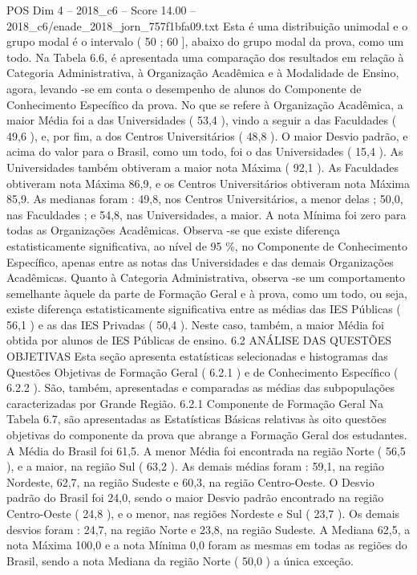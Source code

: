 \begin{textsample}{POS Dim 4 – 2018\_c6 – Score 14.00 – 2018\_c6/enade\_2018\_jorn\_757f1bfa09.txt}
Esta é uma distribuição unimodal e o grupo modal é o intervalo ( 50 ; 60 ], abaixo do grupo modal da prova, como um todo.
Na Tabela 6.6, é apresentada uma comparação dos resultados em relação à Categoria Administrativa, à Organização Acadêmica e à Modalidade de Ensino, agora, levando -se em conta o desempenho de alunos do Componente de Conhecimento Específico da prova.
No que se refere à Organização Acadêmica, a maior Média foi a das Universidades ( 53,4 ), vindo a seguir a das Faculdades ( 49,6 ), e, por fim, a dos Centros Universitários ( 48,8 ).
O maior Desvio padrão, e acima do valor para o Brasil, como um todo, foi o das Universidades ( 15,4 ).
As Universidades também obtiveram a maior nota Máxima ( 92,1 ).
As Faculdades obtiveram nota Máxima 86,9, e os Centros Universitários obtiveram nota Máxima 85,9.
As medianas foram : 49,8, nos Centros Universitários, a menor delas ; 50,0, nas Faculdades ; e 54,8, nas Universidades, a maior.
A nota Mínima foi zero para todas as Organizações Acadêmicas.
Observa -se que existe diferença estatisticamente significativa, ao nível de 95 \%, no Componente de Conhecimento Específico, apenas entre as notas das Universidades e das demais Organizações Acadêmicas.
Quanto à Categoria Administrativa, observa -se um comportamento semelhante àquele da parte de Formação Geral e à prova, como um todo, ou seja, existe diferença estatisticamente significativa entre as médias das IES Públicas ( 56,1 ) e as das IES Privadas ( 50,4 ).
Neste caso, também, a maior Média foi obtida por alunos de IES Públicas de ensino. 6.2 ANÁLISE DAS QUESTÕES OBJETIVAS Esta seção apresenta estatísticas selecionadas e histogramas das Questões Objetivas de Formação Geral ( 6.2.1 ) e de Conhecimento Específico ( 6.2.2 ).
São, também, apresentadas e comparadas as médias das subpopulações caracterizadas por Grande Região. 6.2.1 Componente de Formação Geral Na Tabela 6.7, são apresentadas as Estatísticas Básicas relativas às oito questões objetivas do componente da prova que abrange a Formação Geral dos estudantes.
A Média do Brasil foi 61,5.
A menor Média foi encontrada na região Norte ( 56,5 ), e a maior, na região Sul ( 63,2 ).
As demais médias foram : 59,1, na região Nordeste, 62,7, na região Sudeste e 60,3, na região Centro-Oeste.
O Desvio padrão do Brasil foi 24,0, sendo o maior Desvio padrão encontrado na região Centro-Oeste ( 24,8 ), e o menor, nas regiões Nordeste e Sul ( 23,7 ).
Os demais desvios foram : 24,7, na região Norte e 23,8, na região Sudeste.
A Mediana 62,5, a nota Máxima 100,0 e a nota Mínima 0,0 foram as mesmas em todas as regiões do Brasil, sendo a nota Mediana da região Norte ( 50,0 ) a única exceção.

\end{textsample}
